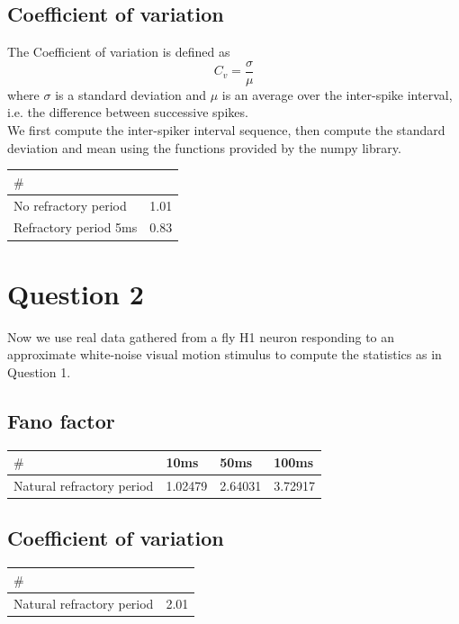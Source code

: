 \documentclass[12pt]{article}
\begin{document}
\subsection{Coefficient of variation}
The Coefficient of variation is defined as
\begin{equation}
    C_v = \frac{\sigma}{\mu}
\end{equation}
where $\sigma$ is a standard deviation and $\mu$ is an average over the inter-spike interval, i.e. the difference between successive spikes.\\
We first compute the inter-spiker interval sequence, then compute the standard deviation and mean using the functions provided by the numpy library.
\begin{center}
    \begin{tabular}{ | m{4cm} | m{2cm}|  } 
    \hline
    $\#$ &   \\ 
    \hline
    No refractory  period & 1.01 \\ 
    \hline
    Refractory period 5ms & 0.83 \\ 
    \hline
    \end{tabular}
\end{center}

\section{Question 2}
Now we use real data gathered from a fly H1 neuron responding to an approximate white-noise visual motion
stimulus to compute the statistics as in Question 1.
\subsection{Fano factor}
\begin{center}
    \begin{tabular}{ | m{5cm} | m{2cm}| m{2cm} | m{2cm} | } 
    \hline
    $\#$ & 10ms & 50ms & 100ms \\ 
    \hline
    Natural refractory period & 1.02479 & 2.64031 & 3.72917\\ 
    \hline
    \end{tabular}
\end{center}

\subsection{Coefficient of variation}
\begin{center}
    \begin{tabular}{ | m{5cm} | m{2cm}|  } 
    \hline
    $\#$ &   \\ 
    \hline
    Natural refractory period & 2.01 \\ 
    \hline
    \end{tabular}
\end{center}
\end{document}
